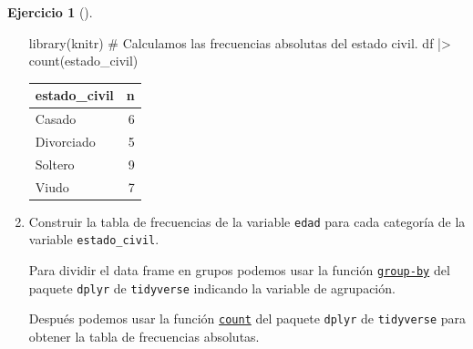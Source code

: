 \documentclass[
  spanish,
  a4paper,
]{scrreport}
\newenvironment{Shaded}{\begin{snugshade}}{\end{snugshade}}
\newcommand{\CommentTok}[1]{\textcolor[rgb]{0.37,0.37,0.37}{#1}}
\newcommand{\FunctionTok}[1]{\textcolor[rgb]{0.28,0.35,0.67}{#1}}
\newcommand{\NormalTok}[1]{\textcolor[rgb]{0.00,0.23,0.31}{#1}}
\newcommand{\SpecialCharTok}[1]{\textcolor[rgb]{0.37,0.37,0.37}{#1}}
\theoremstyle{definition}
\newtheorem{exercise}{Ejercicio}[chapter]
\theoremstyle{remark}
\begin{document}
\begin{exercise}[]
\begin{enumerate}
\begin{tcolorbox}
\begin{Shaded}
\begin{Highlighting}[]
\FunctionTok{library}\NormalTok{(knitr)}
\CommentTok{\# Calculamos las frecuencias absolutas del estado civil.}
\NormalTok{df }\SpecialCharTok{|\textgreater{}} \FunctionTok{count}\NormalTok{(estado\_civil)}
\end{Highlighting}
\end{Shaded}

  \begin{longtable}[]{@{}lr@{}}
  \toprule\noalign{}
  estado\_civil & n \\
  \midrule\noalign{}
  \endhead
  \bottomrule\noalign{}
  \endlastfoot
  Casado & 6 \\
  Divorciado & 5 \\
  Soltero & 9 \\
  Viudo & 7 \\
  \end{longtable}

  \end{tcolorbox}
\item
  Construir la tabla de frecuencias de la variable \texttt{edad} para
  cada categoría de la variable \texttt{estado\_civil}.

  \begin{tcolorbox}[enhanced jigsaw, colback=white, coltitle=black, toprule=.15mm, rightrule=.15mm, opacitybacktitle=0.6, opacityback=0, bottomtitle=1mm, toptitle=1mm, titlerule=0mm, breakable, leftrule=.75mm, title=\textcolor{quarto-callout-tip-color}{\faLightbulb}\hspace{0.5em}{Solución}, arc=.35mm, left=2mm, bottomrule=.15mm, colframe=quarto-callout-tip-color-frame, colbacktitle=quarto-callout-tip-color!10!white]

  Para dividir el data frame en grupos podemos usar la función
  \href{https://aprendeconalf.es/manual-r/06-preprocesamiento.html\#res\%C3\%BAmenes-por-grupos}{\texttt{group-by}}
  del paquete \texttt{dplyr} de \texttt{tidyverse} indicando la variable
  de agrupación.

  Después podemos usar la función
  \href{https://aprendeconalf.es/manual-r/06-preprocesamiento.html\#conteo-del-n\%C3\%BAmero-de-observaciones}{\texttt{count}}
  del paquete \texttt{dplyr} de \texttt{tidyverse} para obtener la tabla
  de frecuencias absolutas.


\end{tcolorbox}
\end{enumerate}
\end{exercise}
\end{document}

